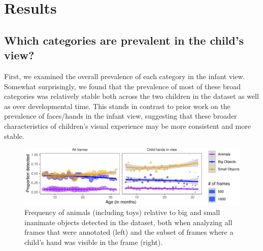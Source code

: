 \documentclass[10pt, letterpaper]{article}
\newenvironment{CodeChunk}{}{}
\begin{document}
\hypertarget{results}{%
\section{Results}\label{results}}

\hypertarget{which-categories-are-prevalent-in-the-childs-view}{%
\subsection{Which categories are prevalent in the child's
view?}\label{which-categories-are-prevalent-in-the-childs-view}}

First, we examined the overall prevalence of each category in the infant
view. Somewhat surprisingly, we found that the prevalence of most of
these broad categories was relatively stable both across the two
children in the dataset as well as over developmental time. This stands
in contrast to prior work on the prevalence of faces/hands in the infant
view, suggesting that these broader characteristics of children's visual
experience may be more consistent and more stable.

\begin{CodeChunk}
\begin{figure}[h]

{\centering \includegraphics{figs/anim_size-1} 

}

\caption[Frequency of animals (including toys) relative to big and small inanimate objects detected in the dataset, both when analyzing all frames that were annotated (left) and the subset of frames where a child's hand was visible in the frame (right)]{Frequency of animals (including toys) relative to big and small inanimate objects detected in the dataset, both when analyzing all frames that were annotated (left) and the subset of frames where a child's hand was visible in the frame (right).}\label{fig:anim_size}
\end{figure}
\end{CodeChunk}
\end{document}
